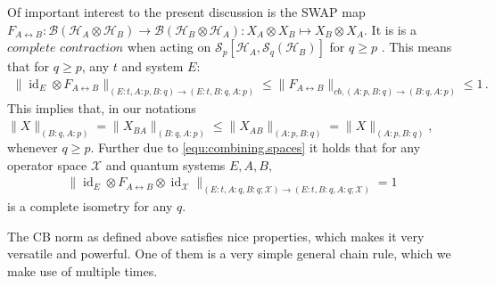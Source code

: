 \documentclass[11pt]{article}
\DeclareMathOperator{\id}{id}
\newcommand{\1}{\ensuremath{\mathbbm{1}}}
\theoremstyle{newdefinition}
\theoremstyle{newplain}
\theoremstyle{myplain}
\begin{document}
\noindent 
Of important interest to the present discussion is the SWAP map $F_{A\leftrightarrow B}:\mathcal{B}(\mathcal{H}_A\otimes\mathcal{H}_B)\to \mathcal{B}(\mathcal{H}_B\otimes\mathcal{H}_A): X_A\otimes X_B\mapsto X_B\otimes X_A$. It is is a $\textit{complete contraction}$ when acting on $\mathcal{S}_p[\mathcal{H}_A,\mathcal{S}_q(\mathcal{H}_B)]$ for $q\geq p$ \cite[Theorem 8]{Devetak.2006}. This means that for $q\geq p$, any $t$ and system $E$:
\begin{align} \label{equ:complete.contraction}
      \|\id_E\otimes F_{A \leftrightarrow B}\|_{(E:t,A:p,B:q)\to (E:t,B:q,A:p)}
    \leq \|F_{A \leftrightarrow B}\|_{cb,(A:p,B:q)\to (B:q,A:p)} \leq 1\,.
\end{align}
This implies that, in our notations $\|X\|_{(B:q,A:p)}=\|X_{BA}\|_{(B:q,A:p)}\leq \|X_{AB}\|_{(A:p,B:q)}=\|X\|_{(A:p,B:q)}$, whenever $q\geq p$. Further due to \eqref{equ:combining.spaces} it holds that for any operator space $\mathcal{X}$ and quantum systems $E,A,B,$
\begin{align}\label{equ:SWAP.isometry}
    \|\id_E\otimes F_{A\leftrightarrow B}\otimes\id_{\mathcal{X}}\|_{(E:t,A:q,B:q;\mathcal{X})\to (E:t,B:q,A:q;\mathcal{X})} = 1
\end{align} is a complete isometry for any $q$.




The CB norm as defined above satisfies nice properties, which makes it very versatile and powerful. One of them is a very simple general chain rule, which we make use of multiple times.
\end{document}
